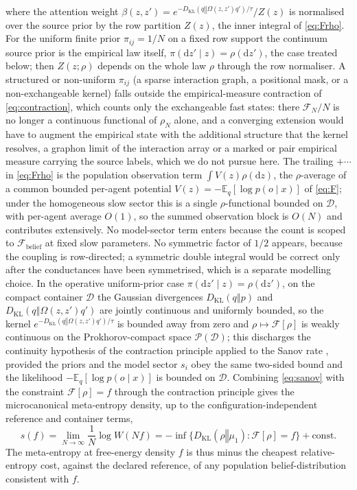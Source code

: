 \documentclass[11pt]{article}
\theoremstyle{plain}
\theoremstyle{definition}
\newcommand{\KL}[2]{D_{\mathrm{KL}}\mathopen{}\left(#1 \mathbin{\Vert} #2\right)\mathclose{}}
\newcommand{\E}{\mathbb{E}}
\newcommand{\dd}{\mathrm{d}}
\newcommand{\Fcal}{\mathcal{F}}
\newcommand{\Dcal}{\mathcal{D}}
\newcommand{\Pcal}{\mathcal{P}}
\newcommand{\Wmeta}{W}
\begin{document}
where the attention weight $\beta(z,z')=e^{-\KL{q}{\Omega(z,z') q'}/\tau}/Z(z)$ is
normalised over the source prior by the row partition $Z(z)$, the inner integral of
\cref{eq:Frho}. For the uniform finite prior $\pi_{ij}=1/N$ on a fixed row support the
continuum source prior is the empirical law itself, $\pi(\dd z'\mid z)=\rho(\dd z')$, the
case treated below; then $Z(z;\rho)$ depends on the whole law $\rho$ through the row
normaliser. A structured or non-uniform $\pi_{ij}$ (a sparse interaction graph, a positional mask, or a
non-exchangeable kernel) falls outside the empirical-measure contraction of \cref{eq:contraction}, which
counts only the exchangeable fast states: there $\Fcal_N/N$ is no longer a continuous functional of $\rho_N$
alone, and a converging extension would have to augment the empirical state with the additional structure that
the kernel resolves, a graphon limit of the interaction array or a marked or pair empirical measure carrying
the source labels, which we do not pursue here. The trailing $+\cdots$ in \cref{eq:Frho} is the population observation term $\int V(z)\rho(\dd z)$, the $\rho$-average of a common bounded per-agent potential $V(z)=-\E_q[\log p(o\mid x)]$ of \cref{eq:F}; under the homogeneous slow sector this is a single $\rho$-functional bounded on $\Dcal$, with per-agent average $O(1)$, so the summed observation block is $O(N)$ and contributes extensively. No model-sector term enters because the count is scoped to $\Fcal_{\mathrm{belief}}$ at fixed slow parameters. No symmetric factor of $1/2$ appears, because the coupling is
row-directed; a symmetric double integral would be correct only after the conductances
have been symmetrised, which is a separate modelling choice. In the operative uniform-prior
case $\pi(\dd z'\mid z)=\rho(\dd z')$, on the compact container
$\Dcal$ the Gaussian divergences $\KL{q}{p}$ and $\KL{q}{\Omega(z,z') q'}$ are jointly
continuous and uniformly bounded, so the kernel $e^{-\KL{q}{\Omega(z,z') q'}/\tau}$ is bounded
away from zero and $\rho\mapsto\Fcal[\rho]$ is weakly continuous on the Prokhorov-compact
space $\Pcal(\Dcal)$; this discharges the continuity hypothesis of the contraction
principle \citep[Thm.~4.2.1]{dembo1998large} applied to the Sanov rate
\citep[Thm.~6.2.10]{dembo1998large}, provided the priors and the model sector $s_i$ obey
the same two-sided bound and the likelihood $-\E_q[\log p(o\mid x)]$ is bounded on
$\Dcal$. Combining \cref{eq:sanov}
with the constraint $\Fcal[\rho]=f$ through the contraction principle gives the
microcanonical meta-entropy density, up to the configuration-independent reference and
container terms,
\begin{equation}
\label{eq:contraction}
s(f)=\lim_{N\to\infty}\frac1N\log\Wmeta(Nf)
=-\inf\bigl\{ \KL{\rho}{\mu_1} : \Fcal[\rho]=f \bigr\}+\text{const}.
\end{equation}
The meta-entropy at free-energy density $f$ is thus minus the cheapest relative-entropy
cost, against the declared reference, of any population belief-distribution consistent
with $f$.
\end{document}
